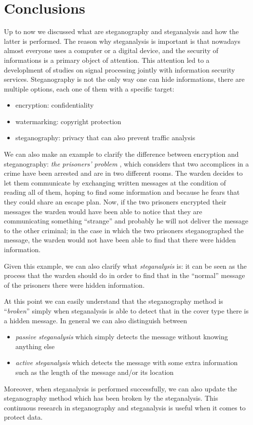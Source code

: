 \documentclass[../../main.tex]{subfiles}
\begin{document}
\section{Conclusions}

Up to now we discussed what are steganography and steganalysis and how the
latter is performed. The reason why steganalysis is important is that nowadays
almost everyone uses a computer or a digital device, and the security of
informations is a primary object of attention. This attention led to a
developlment of studies on signal processing jointly with information security
services. Steganography is not the only way one can hide informations, there are
multiple options, each one of them with a specific target:

\begin{itemize}
    \item encryption: confidentiality
    \item watermarking: copyright protection
    \item steganography: privacy that can also prevent traffic analysis
\end{itemize}

We can also make an example to clarify the difference between encryption and
steganography: \emph{the prisoners' problem} \cite{prisoners-problem}, which
considers that two accomplices in a crime have been arrested and are in two
different rooms. The warden decides to let them communicate by exchanging
written messages at the condition of reading all of them, hoping to find some
information and because he fears that they could share an escape plan. Now, if
the two prisoners encrypted their messages the warden would have been able to
notice that they are communicating something ``strange'' and probably he will
not deliver the message to the other criminal; in the case in which the two
prisoners steganographed the message, the warden would not have been able to
find that there were hidden information.

Given this example, we can also clarify what \emph{steganalysis} is: it can be
seen as the process that the warden should do in order to find that in the
``normal'' message of the prisoners there were hidden information.

At this point we can easily understand that the steganography method is
``\emph{broken}'' simply when steganalysis is able to detect that in the cover
type there is a hidden message. In general we can also distinguish between

\begin{itemize}
    \item \emph{passive steganalysis} which simply detects the message without
          knowing anything else
    \item \emph{active steganalysis} which detects the message with some extra
          information such as the length of the message and/or its location
\end{itemize}

Moreover, when steganalysis is performed successfully, we can also update the
steganography method which has been broken by the steganalysis. This continuous
research in steganography and steganalysis is useful when it comes to protect
data. \cite{review-audio-steganalysis}
\end{document}
